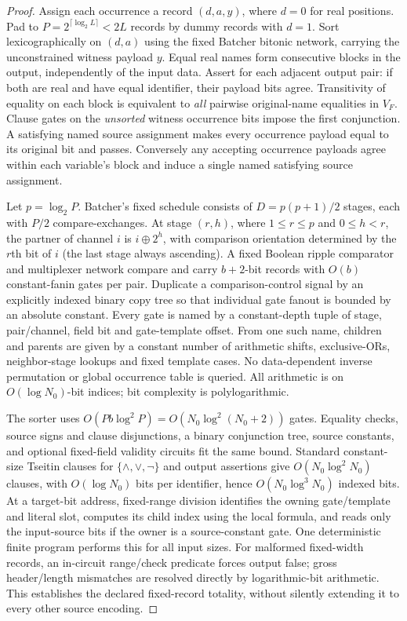\documentclass[11pt]{article}
\begin{document}
\begin{proof}
Assign each occurrence a record $(d,a,y)$, where $d=0$ for real positions. Pad to $P=2^{\lceil\log_2 L\rceil}<2L$ records by dummy records with $d=1$. Sort lexicographically on $(d,a)$ using the fixed Batcher bitonic network, carrying the unconstrained witness payload $y$. Equal real names form consecutive blocks in the output, independently of the input data. Assert for each adjacent output pair: if both are real and have equal identifier, their payload bits agree. Transitivity of equality on each block is equivalent to \emph{all} pairwise original-name equalities in $V_F$. Clause gates on the \emph{unsorted} witness occurrence bits impose the first conjunction. A satisfying named source assignment makes every occurrence payload equal to its original bit and passes. Conversely any accepting occurrence payloads agree within each variable's block and induce a single named satisfying source assignment.

Let $p=\log_2P$. Batcher's fixed schedule consists of $D=p(p+1)/2$ stages, each with $P/2$ compare-exchanges. At stage $(r,h)$, where $1\le r\le p$ and $0\le h<r$, the partner of channel $i$ is $i\oplus2^h$, with comparison orientation determined by the $r$th bit of $i$ (the last stage always ascending). A fixed Boolean ripple comparator and multiplexer network compare and carry $b+2$-bit records with $O(b)$ constant-fanin gates per pair. Duplicate a comparison-control signal by an explicitly indexed binary copy tree so that individual gate fanout is bounded by an absolute constant. Every gate is named by a constant-depth tuple of stage, pair/channel, field bit and gate-template offset. From one such name, children and parents are given by a constant number of arithmetic shifts, exclusive-ORs, neighbor-stage lookups and fixed template cases. No data-dependent inverse permutation or global occurrence table is queried. All arithmetic is on $O(\log N_0)$-bit indices; bit complexity is polylogarithmic.

The sorter uses $O(Pb\log^2P)=O(N_0\log^2(N_0+2))$ gates. Equality checks, source signs and clause disjunctions, a binary conjunction tree, source constants, and optional fixed-field validity circuits fit the same bound. Standard constant-size Tseitin clauses for $\{\wedge,\vee,\neg\}$ and output assertions give $O(N_0\log^2 N_0)$ clauses, with $O(\log N_0)$ bits per identifier, hence $O(N_0\log^3 N_0)$ indexed bits. At a target-bit address, fixed-range division identifies the owning gate/template and literal slot, computes its child index using the local formula, and reads only the input-source bits if the owner is a source-constant gate. One deterministic finite program performs this for all input sizes. For malformed fixed-width records, an in-circuit range/check predicate forces output false; gross header/length mismatches are resolved directly by logarithmic-bit arithmetic. This establishes the declared fixed-record totality, without silently extending it to every other source encoding.
\end{proof}
\end{document}
